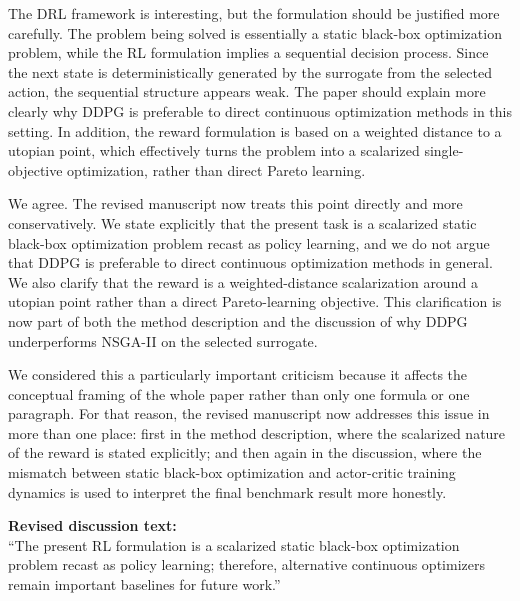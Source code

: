 \begin{ReviewerComment}
The DRL framework is interesting, but the formulation should be justified more carefully. The problem being solved is essentially a static black-box optimization problem, while the RL formulation implies a sequential decision process. Since the next state is deterministically generated by the surrogate from the selected action, the sequential structure appears weak. The paper should explain more clearly why DDPG is preferable to direct continuous optimization methods in this setting. In addition, the reward formulation is based on a weighted distance to a utopian point, which effectively turns the problem into a scalarized single-objective optimization, rather than direct Pareto learning.
\end{ReviewerComment}
%
\begin{Answer}
We agree. The revised manuscript now treats this point directly and more conservatively. We state explicitly that the present task is a scalarized static black-box optimization problem recast as policy learning, and we do not argue that DDPG is preferable to direct continuous optimization methods in general. We also clarify that the reward is a weighted-distance scalarization around a utopian point rather than a direct Pareto-learning objective. This clarification is now part of both the method description and the discussion of why DDPG underperforms NSGA-II on the selected surrogate.

We considered this a particularly important criticism because it affects the conceptual framing of the whole paper rather than only one formula or one paragraph. For that reason, the revised manuscript now addresses this issue in more than one place: first in the method description, where the scalarized nature of the reward is stated explicitly; and then again in the discussion, where the mismatch between static black-box optimization and actor-critic training dynamics is used to interpret the final benchmark result more honestly.
\end{Answer}
\begin{RevisionExcerpt}
\noindent\textbf{Revised discussion text:}\\
``The present RL formulation is a scalarized static black-box optimization problem recast as policy learning; therefore, alternative continuous optimizers remain important baselines for future work.''
\end{RevisionExcerpt}

